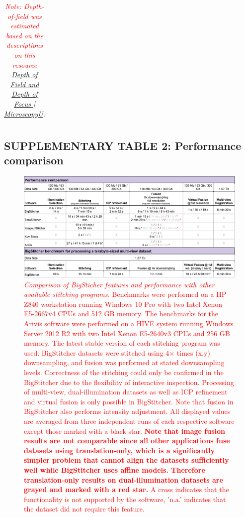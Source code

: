 \documentclass[]{spie}  %
\def\red{\textcolor{red}}
\begin{document}
\begin{landscape}
{\begin{longtable}{lll}
\caption{\red{\emph{Note: Depth-of-field was estimated based on the descriptions on this resource \href{https://www.microscopyu.com/microscopy-basics/depth-of-field-and-depth-of-focus}{Depth of Field and Depth of Focus | MicroscopyU}.}}}

\end{longtable}}

\pagebreak

\captionsetup{singlelinecheck = false, format=plain, justification=justified, labelsep=space}

\subsection*{SUPPLEMENTARY TABLE 2: Performance comparison}
\begin{figure}[h!]
\center\includegraphics[width=\textwidth+5.00cm]{supp_table_1.pdf}
\vspace{0.5mm}
\caption{\hspace{-0.5mm} \red{\emph{Comparison of BigSticher features and performance with other available stitching programs.} Benchmarks were performed on a HP Z840 workstation running Windows 10 Pro with two Intel Xenon E5-2667v4 CPUs and 512 GB memory. The benchmarks for the Arivis software were performed on a HIVE system running Windows Server 2012 R2 with two Intel Xenon E5-2640v3 CPUs and 256 GB memory. The latest stable version of each stitching program was used. BigStitcher datasets were stitched using 4$\times$ times (x,y) downsampling, and fusion was performed at stated downsampling levels. Correctness of the stitching could only be confirmed in the BigStitcher due to the flexibility of interactive inspection. Processing of multi-view, dual-illumination datasets as well as ICP refinement and virtual fusion is only possible in BigStitcher. Note that fusion in BigStitcher also performs intensity adjustment. All displayed values are averaged from three independent runs of each respective software except those marked with a black star. \textbf{Note that image fusion results are not comparable since all other applications fuse datasets using translation-only, which is a significantly simpler problem that cannot align the datasets sufficiently well while BigStitcher uses affine models. Therefore translation-only results on dual-illumination datasets are grayed and marked with a red star.} A cross indicates that the functionality is not supported by the software, 'n.a.' indicates that the dataset did not require this feature.}
}
\end{figure}
\end{landscape}
\end{document}
